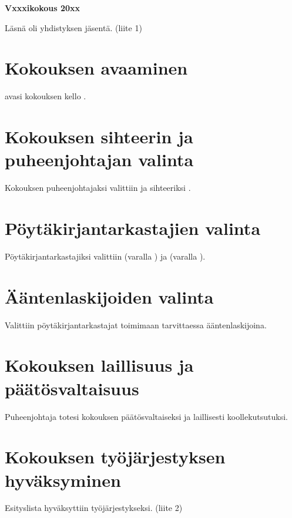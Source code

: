 \documentclass[a4paper,finnish]{article}
\begin{document}
{\Large \bf Vxxxikokous 20xx}\hfill\usebox{\sijainti}

\vspace*{0.7cm}

Läsnä oli \usebox{\osallistujamaara} yhdistyksen jäsentä. (liite 1)

\section{Kokouksen avaaminen}
\usebox{\puhis} avasi kokouksen kello \usebox{\alkamisaika}.

\section{Kokouksen sihteerin ja puheenjohtajan valinta}

Kokouksen puheenjohtajaksi valittiin \usebox{\puhis} ja sihteeriksi
\usebox{\sihteeri}. 

\section{Pöytäkirjantarkastajien valinta}

Pöytäkirjantarkastajiksi valittiin \usebox{\tark} (varalla \usebox{\varaA}) ja
\usebox{\tokatark} (varalla \usebox{\varaB}).

\section{Ääntenlaskijoiden valinta}

Valittiin pöytäkirjantarkastajat toimimaan tarvittaessa ääntenlaskijoina.

\section{Kokouksen laillisuus ja päätösvaltaisuus}

Puheenjohtaja totesi kokouksen päätösvaltaiseksi ja laillisesti
koollekutsutuksi.

\section{Kokouksen työjärjestyksen hyväksyminen}

Esityslista hyväksyttiin työjärjestykseksi. (liite 2) 

\section{}
\end{document}
